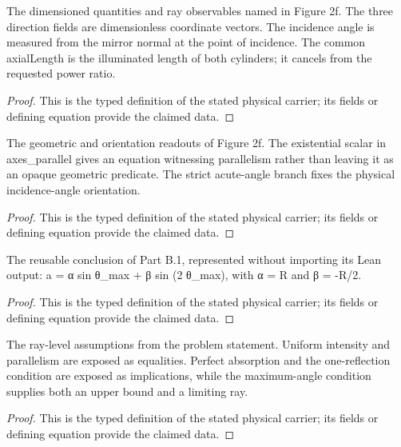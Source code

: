 \begin{definition}
  \label{def:physics:IPhO_2026_2_B_2:aux006}
  The dimensioned quantities and ray observables named in Figure 2f. The three direction fields are dimensionless coordinate vectors. The incidence angle is measured from the mirror normal at the point of incidence. The common axialLength is the illuminated length of both cylinders; it cancels from the requested power ratio.
\end{definition}
\begin{proof}
  This is the typed definition of the stated physical carrier; its fields or defining equation provide the claimed data.
\end{proof}

\begin{definition}
  \label{def:physics:IPhO_2026_2_B_2:aux007}
  The geometric and orientation readouts of Figure 2f. The existential scalar in axes\_parallel gives an equation witnessing parallelism rather than leaving it as an opaque geometric predicate. The strict acute-angle branch fixes the physical incidence-angle orientation.
\end{definition}
\begin{proof}
  This is the typed definition of the stated physical carrier; its fields or defining equation provide the claimed data.
\end{proof}

\begin{definition}
  \label{def:physics:IPhO_2026_2_B_2:aux008}
  The reusable conclusion of Part B.1, represented without importing its Lean output: a = α sin θ\_max + β sin (2 θ\_max), with α = R and β = -R/2.
\end{definition}
\begin{proof}
  This is the typed definition of the stated physical carrier; its fields or defining equation provide the claimed data.
\end{proof}

\begin{definition}
  \label{def:physics:IPhO_2026_2_B_2:aux009}
  The ray-level assumptions from the problem statement. Uniform intensity and parallelism are exposed as equalities. Perfect absorption and the one-reflection condition are exposed as implications, while the maximum-angle condition supplies both an upper bound and a limiting ray.
\end{definition}
\begin{proof}
  This is the typed definition of the stated physical carrier; its fields or defining equation provide the claimed data.
\end{proof}

